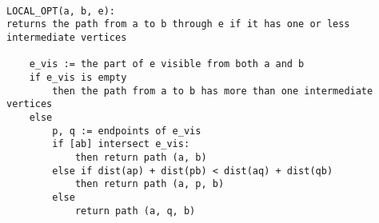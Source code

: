 \documentclass{article}
\begin{document}
\begin{verbatim}

LOCAL_OPT(a, b, e):
returns the path from a to b through e if it has one or less intermediate vertices

    e_vis := the part of e visible from both a and b
    if e_vis is empty
        then the path from a to b has more than one intermediate vertices
    else
        p, q := endpoints of e_vis
        if [ab] intersect e_vis:
            then return path (a, b)
        else if dist(ap) + dist(pb) < dist(aq) + dist(qb)
            then return path (a, p, b)
        else
            return path (a, q, b)


\end{verbatim}
\end{document}
